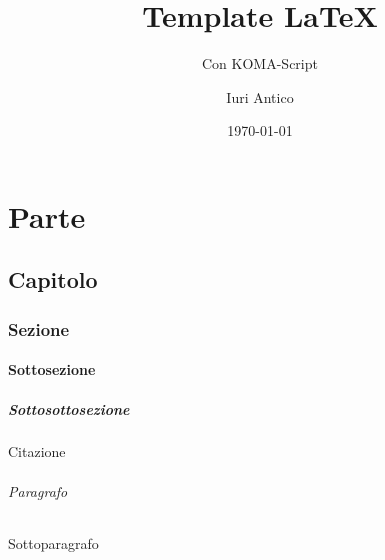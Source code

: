 \documentclass[12pt]{scrreprt}
\title{Template \LaTeX}
\subtitle{Con KOMA-Script}
\author{Iuri Antico}
\date{\today}
\begin{document}
	
	\begin{titlepage}
		\maketitle
	\end{titlepage}
	
	\tableofcontents
	
	\part{Parte}
	\chapter{Capitolo}
	\section{Sezione}
	\subsection{Sottosezione}
	\subsubsection{Sottosottosezione}
	Citazione \cite{IuriTex}

	\paragraph{Paragrafo}
	\subparagraph{Sottoparagrafo}
	
	
	
\end{document}

